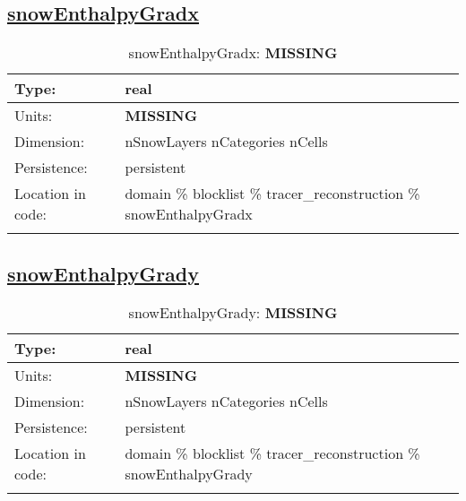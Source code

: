 \subsection[snowEnthalpyGradx]{\hyperref[sec:var_tab_tracer_reconstruction]{snowEnthalpyGradx}}
\label{subsec:var_sec_tracer_reconstruction_snowEnthalpyGradx}
\begin{center}
\begin{longtable}{| p{2.0in} | p{4.0in} |}
        \hline 
        Type: & real \\
        \hline 
        Units: & {\bf \color{red} MISSING} \\
        \hline 
        Dimension: & nSnowLayers nCategories nCells \\
        \hline 
        Persistence: & persistent \\
        \hline 
         Location in code: & domain \% blocklist \% tracer\_reconstruction \% snowEnthalpyGradx \\
         \hline 
    \caption{snowEnthalpyGradx: {\bf \color{red} MISSING}}
\end{longtable}
\end{center}
\subsection[snowEnthalpyGrady]{\hyperref[sec:var_tab_tracer_reconstruction]{snowEnthalpyGrady}}
\label{subsec:var_sec_tracer_reconstruction_snowEnthalpyGrady}
\begin{center}
\begin{longtable}{| p{2.0in} | p{4.0in} |}
        \hline 
        Type: & real \\
        \hline 
        Units: & {\bf \color{red} MISSING} \\
        \hline 
        Dimension: & nSnowLayers nCategories nCells \\
        \hline 
        Persistence: & persistent \\
        \hline 
         Location in code: & domain \% blocklist \% tracer\_reconstruction \% snowEnthalpyGrady \\
         \hline 
    \caption{snowEnthalpyGrady: {\bf \color{red} MISSING}}
\end{longtable}
\end{center}
